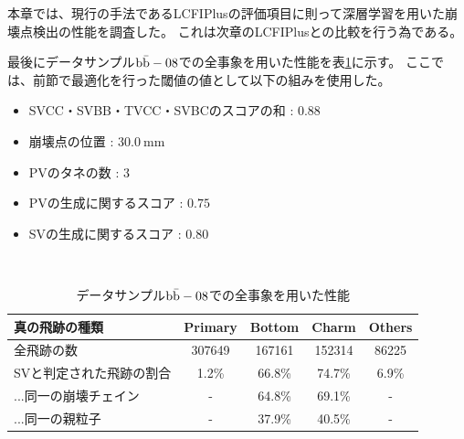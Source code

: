 本章では、現行の手法であるLCFIPlusの評価項目に則って深層学習を用いた崩壊点検出の性能を調査した。
これは次章のLCFIPlusとの比較を行う為である。

最後にデータサンプル$\rm b\bar{b}-08$での全事象を用いた性能を表\ref{PerformanceofAllEvents}に示す。
ここでは、前節で最適化を行った閾値の値として以下の組みを使用した。

\begin{itemize}
 \item SVCC・SVBB・TVCC・SVBCのスコアの和 : $0.88$
 \item 崩壊点の位置 : $30.0\ {\mathrm{mm}}$
 \item PVのタネの数 : $3$
 \item PVの生成に関するスコア : $0.75$
 \item SVの生成に関するスコア : $0.80$
\end{itemize}

\begin{table}[htb]
 \centering
　\small
  \begin{tabular}{l c c c c} \hline
    真の飛跡の種類 & Primary & Bottom & Charm & Others\\ \hline
    全飛跡の数 & 307649 & 167161 & 152314 & 86225\\
    SVと判定された飛跡の割合 & 1.2\% & 66.8\% & 74.7\% & 6.9\%\\
    ...同一の崩壊チェイン & - & 64.8\% & 69.1\% & - \\
    ...同一の親粒子 & - & 37.9\% & 40.5\% & - \\\hline
  \end{tabular}
  \caption{データサンプル$\rm b\bar{b}-08$での全事象を用いた性能}
  \label{PerformanceofAllEvents}
\end{table}



























